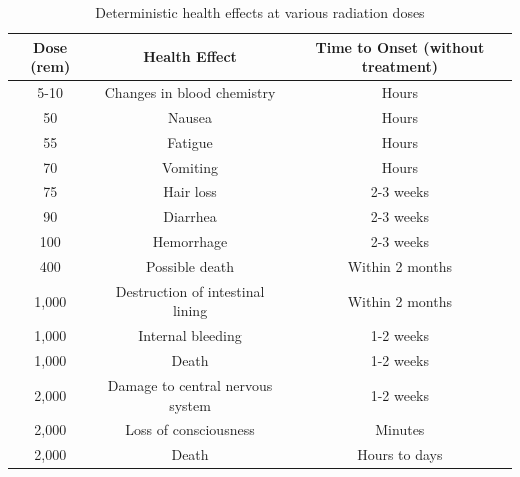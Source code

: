 \documentclass{report}
\begin{document}
\begin{table}[h]
\centering
\begin{tabular}{|c|c|c|}
\hline
\textbf{Dose (rem)} & \textbf{Health Effect}           & \textbf{Time to Onset (without treatment)} \\ \hline
5-10                    & Changes in blood chemistry       & Hours                                      \\ \hline
50                      & Nausea                           & Hours                                      \\ \hline
55                      & Fatigue                          & Hours                                      \\ \hline
70                      & Vomiting                         & Hours                                      \\ \hline
75                      & Hair loss                        & 2-3 weeks                                  \\ \hline
90                      & Diarrhea                         & 2-3 weeks                                  \\ \hline
100                     & Hemorrhage                       & 2-3 weeks                                  \\ \hline
400                     & Possible death                   & Within 2 months                            \\ \hline
1,000                   & Destruction of intestinal lining & Within 2 months                            \\ \hline
1,000                   & Internal bleeding                & 1-2 weeks                                  \\ \hline
1,000                   & Death                            & 1-2 weeks                                  \\ \hline
2,000                   & Damage to central nervous system & 1-2 weeks                                  \\ \hline
2,000                   & Loss of consciousness            & Minutes                                    \\ \hline
2,000                   & Death                            & Hours to days                              \\ \hline
\end{tabular}
\caption[Deterministic health effects at various radiation doses \cite{USEPA1999}]{Deterministic health effects at various radiation doses \cite{USEPA1999} \footnotemark}
\label{tab:health_effects}
\end{table} 
\end{document}
